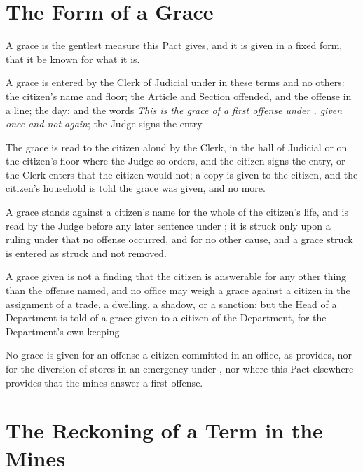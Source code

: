 \section{The Form of a Grace}
\label{sec:crimes:form-of-a-grace}

A grace is the gentlest measure this Pact gives, and it is given in a fixed form, that it be known for what it is.

\begin{clauses}
\item A grace is entered by the Clerk of Judicial under  in these terms and no others: the citizen's name and floor; the Article and Section offended, and the offense in a line; the day; and the words \emph{This is the grace of a first offense under , given once and not again}; the Judge signs the entry.
\item The grace is read to the citizen aloud by the Clerk, in the hall of Judicial or on the citizen's floor where the Judge so orders, and the citizen signs the entry, or the Clerk enters that the citizen would not; a copy is given to the citizen, and the citizen's household is told the grace was given, and no more.
\item A grace stands against a citizen's name for the whole of the citizen's life, and is read by the Judge before any later sentence under ; it is struck only upon a ruling under  that no offense occurred, and for no other cause, and a grace struck is entered as struck and not removed.
\item A grace given is not a finding that the citizen is answerable for any other thing than the offense named, and no office may weigh a grace against a citizen in the assignment of a trade, a dwelling, a shadow, or a sanction; but the Head of a Department is told of a grace given to a citizen of the Department, for the Department's own keeping.
\item No grace is given for an offense a citizen committed in an office, as  provides, nor for the diversion of stores in an emergency under , nor where this Pact elsewhere provides that the mines answer a first offense.
\end{clauses}

\section{The Reckoning of a Term in the Mines}
\label{sec:crimes:reckoning-of-a-term-in-the-mines}

